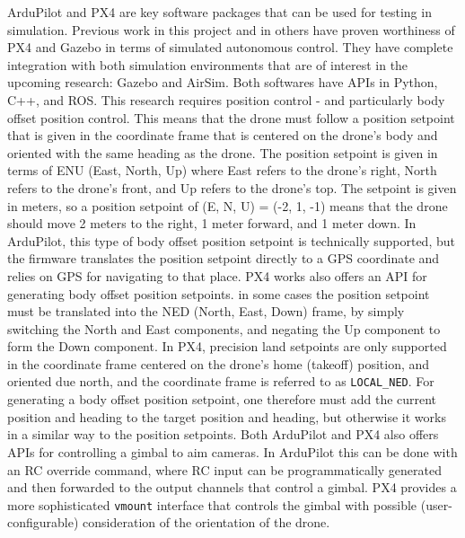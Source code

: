 ArduPilot and PX4 are key software packages that can be used for testing in simulation.
Previous work in this project and in others have proven worthiness of PX4 and Gazebo in terms of simulated autonomous control.
They have complete integration with both simulation environments that are of interest in the upcoming research:
Gazebo and AirSim.
Both softwares have APIs in Python, C++, and ROS.
This research requires position control - and particularly body offset position control.
This means that the drone must follow a position setpoint that is given in the coordinate frame
that is centered on the drone's body and oriented with the same heading as the drone.
The position setpoint is given in terms of ENU (East, North, Up)
where East refers to the drone's right,
North refers to the drone's front,
and Up refers to the drone's top.
The setpoint is given in meters, so a position setpoint of (E, N, U) = (-2, 1, -1)
means that the drone should move 2 meters to the right,
1 meter forward, and 1 meter down.
In ArduPilot, this type of body offset position setpoint is technically supported,
but the firmware translates the position setpoint
directly to a GPS coordinate and relies on GPS for navigating to that place.
PX4 works also offers an API for generating body offset position setpoints.
in some cases the position setpoint must be translated into the NED (North, East, Down) frame,
by simply switching the North and East components, and negating the Up component to form the Down component.
In PX4, precision land setpoints are only supported in the coordinate frame centered on the drone's home (takeoff) position,
and oriented due north, and the coordinate frame is referred to as \texttt{LOCAL\_NED}.
For generating a body offset position setpoint, one therefore must add the current position and heading
to the target position and heading, but otherwise it works in a similar way to the position setpoints.
Both ArduPilot and PX4 also offers APIs for controlling a gimbal to aim cameras.
In ArduPilot this can be done with an RC override command, where RC input can be programmatically generated and then
forwarded to the output channels that control a gimbal.
PX4 provides a more sophisticated \texttt{vmount} interface that controls the gimbal with possible (user-configurable) consideration
of the orientation of the drone.

